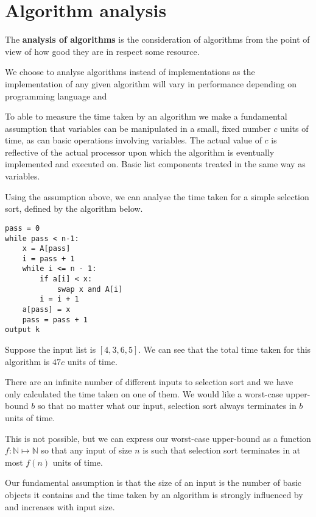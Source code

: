 \chapter{Algorithm analysis}

\begin{definition}
    The \textbf{analysis of algorithms} is the consideration of algorithms from the point of view of how good they are in respect some resource.
\end{definition}

We choose to analyse algorithms instead of implementations as the implementation of any given algorithm will vary in performance depending on programming language and 

To able to measure the time taken by an algorithm we make a fundamental assumption that variables can be manipulated in a small, fixed number $c$ units of time, as can basic operations involving variables. The actual value of $c$ is reflective of the actual processor upon which the algorithm is eventually implemented and executed on. Basic list components treated in the same way as variables.

\begin{example}
    Using the assumption above, we can analyse the time taken for a simple selection sort, defined by the algorithm below.
    \begin{verbatim}
pass = 0
while pass < n-1:
    x = A[pass]
    i = pass + 1
    while i <= n - 1:
        if a[i] < x:
            swap x and A[i]
        i = i + 1
    a[pass] = x
    pass = pass + 1
output k
    \end{verbatim}
    
    Suppose the input list is $[4,3,6,5]$. We can see that the total time taken for this algorithm is $47c$ units of time.
\end{example}

\begin{remark}
    There are an infinite number of different inputs to selection sort and we have only calculated the time taken on one of them. We would like a worst-case upper-bound $b$ so that no matter what our input, selection sort always terminates in $b$ units of time.
    
    This is not possible, but we can express our worst-case upper-bound as a function $f:\mathbb N\mapsto\mathbb N$ so that any input of size $n$ is such that selection sort terminates in at most $f(n)$ units of time. 

    Our fundamental assumption is that the size of an input is the number of basic objects it contains and the time taken by an algorithm is strongly influenced by and increases with input size.
\end{remark}


